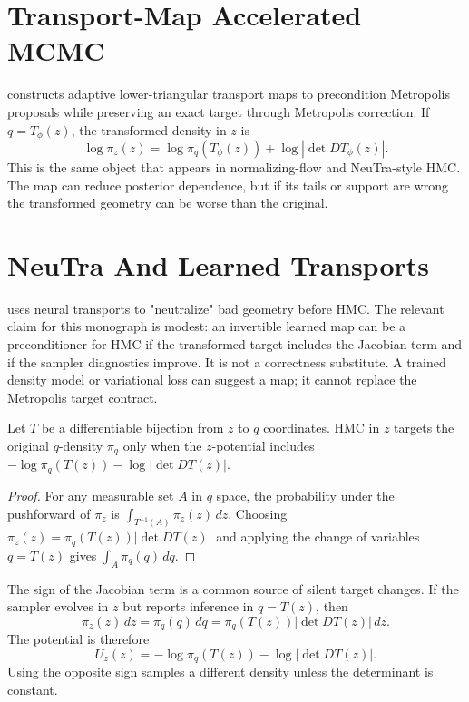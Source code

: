 \section{Transport-Map Accelerated MCMC}
\label{sec:bf-hd-transport-mcmc}

\citet{parno2018transport} constructs adaptive lower-triangular transport maps
to precondition Metropolis proposals while preserving an exact target through
Metropolis correction.  If $q=T_\phi(z)$, the transformed density in $z$ is
\begin{equation}
  \log \pi_z(z)=\log \pi_q(T_\phi(z))+\log|\det DT_\phi(z)|.
  \label{eq:bf-hd-transport-target}
\end{equation}
This is the same object that appears in normalizing-flow and NeuTra-style HMC.
The map can reduce posterior dependence, but if its tails or support are wrong
the transformed geometry can be worse than the original.

\section{NeuTra And Learned Transports}
\label{sec:bf-hd-neutra}

\citet{hoffman2019neutra} uses neural transports to "neutralize" bad geometry
before HMC.  The relevant claim for this monograph is modest: an invertible
learned map can be a preconditioner for HMC if the transformed target includes
the Jacobian term and if the sampler diagnostics improve.  It is not a
correctness substitute.  A trained density model or variational loss can suggest
a map; it cannot replace the Metropolis target contract.

\begin{proposition}
\label{prop:bf-hd-jacobian-target}
Let $T$ be a differentiable bijection from $z$ to $q$ coordinates.  HMC in $z$
targets the original $q$-density $\pi_q$ only when the $z$-potential includes
$-\log\pi_q(T(z))-\log|\det DT(z)|$.
\end{proposition}

\begin{proof}
For any measurable set $A$ in $q$ space, the probability under the pushforward
of $\pi_z$ is $\int_{T^{-1}(A)}\pi_z(z)\,dz$.  Choosing
$\pi_z(z)=\pi_q(T(z))|\det DT(z)|$ and applying the change of variables
$q=T(z)$ gives $\int_A\pi_q(q)\,dq$.
\end{proof}

The sign of the Jacobian term is a common source of silent target changes.  If
the sampler evolves in \(z\) but reports inference in \(q=T(z)\), then
\[
  \pi_z(z)\,dz=\pi_q(q)\,dq
  =\pi_q(T(z))|\det DT(z)|\,dz.
\]
The potential is therefore
\[
  U_z(z)=-\log\pi_q(T(z))-\log|\det DT(z)|.
\]
Using the opposite sign samples a different density unless the determinant is
constant.

